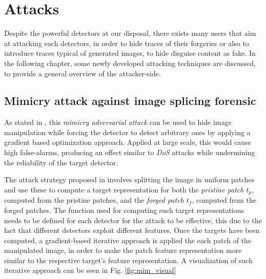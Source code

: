 \documentclass[conference]{IEEEtran} %
\begin{document}
\section{Attacks}
    Despite the powerful detectors at our disposal, there exists many users that aim at attacking such detectors, in order to hide traces of their forgeries or also to introduce traces typical of generated images, to hide disguise content as fake. In the following chapter, some newly developed attacking techniques are discussed, to provide a general overview of the attacker-side.

    \subsection{Mimicry attack against image splicing forensic}
        As stated in \cite{boato2024adversarial}, this \textit{mimicry adversarial attack} can be used to hide image manipulation while forcing the detector to detect arbitrary ones by applying a gradient based optimization approach. Applied at large scale, this would cause high false-alarms, producing an effect similar to \textit{DoS} attacks while undermining the reliability of the target detector.

        The attack strategy proposed in \cite{boato2024adversarial} involves splitting the image in uniform patches and use these to compute a target representation for both the \textit{pristine patch $t_p$}, computed from the pristine patches, and the \textit{forged patch $t_f$}, computed from the forged patches. The function used for computing such target representations needs to be defined for each detector for the attack to be effective, this due to the fact that different detectors exploit different features. Once the targets have been computed, a gradient-based iterative approach is applied the each patch of the manipulated image, in order to make the patch feature representation more similar to the respective target's feature representation. A visualization of such iterative approach can be seen in Fig. \ref{fig:mim_visual}
\end{document}
